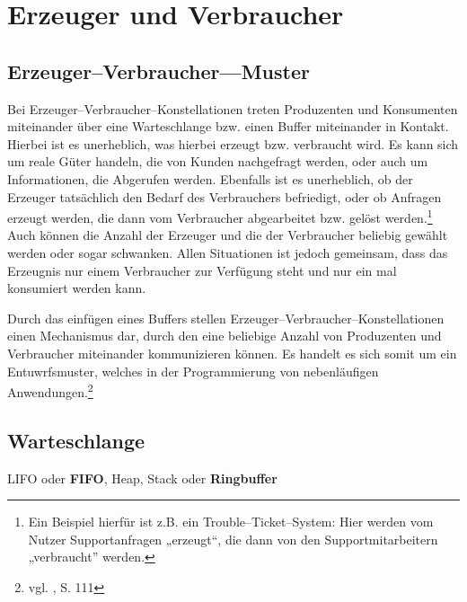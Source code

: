 
\section{Erzeuger und Verbraucher} %
\label{sec:erzeuger_und_verbraucher}

\subsection{Erzeuger–Verbraucher—Muster} %
\label{sub:erzeuger_verbraucher_muster}

Bei Erzeuger–Verbraucher–Konstellationen treten Produzenten und Konsumenten miteinander über eine Warteschlange bzw. einen Buffer miteinander in Kontakt.
Hierbei ist es unerheblich, was hierbei erzeugt bzw. verbraucht wird. Es kann sich um reale Güter handeln, die von Kunden nachgefragt werden, oder auch um Informationen, die Abgerufen werden. Ebenfalls ist es unerheblich, ob der Erzeuger tatsächlich den Bedarf des Verbrauchers befriedigt, oder ob Anfragen erzeugt werden, die dann vom Verbraucher abgearbeitet bzw. gelöst werden.\footnote{Ein Beispiel hierfür ist z.B. ein Trouble–Ticket–System: Hier werden vom Nutzer Supportanfragen „erzeugt“, die dann von den Supportmitarbeitern „verbraucht” werden.} 
Auch können die Anzahl der Erzeuger und die der Verbraucher beliebig gewählt werden oder sogar schwanken. Allen Situationen ist jedoch gemeinsam, dass das Erzeugnis nur einem Verbraucher zur Verfügung steht und nur ein mal konsumiert werden kann.

Durch das einfügen eines Buffers stellen Erzeuger–Verbraucher–Konstellationen einen Mechanismus dar, 
durch den eine beliebige Anzahl von Produzenten und Verbraucher miteinander kommunizieren können.
Es handelt es sich somit um ein Entuwrfsmuster, welches in der Programmierung von nebenläufigen Anwendungen.\footnote{vgl. \cite{openmp}, S. 111} 


\subsection{Warteschlange} %
\label{sub:warteschlange}

\ac{LIFO} oder \textbf{\ac{FIFO}}, Heap, Stack oder \textbf{Ringbuffer}

